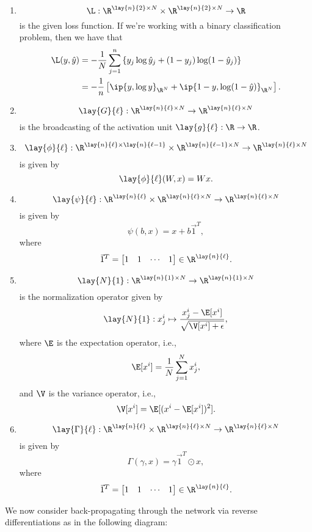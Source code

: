 \begin{enumerate}
	\item $$\L:\R^{\lay{n}{2}\times N}\times\R^{\lay{n}{2}\times N}\to\R$$
	is the given loss function.  If we're working with a binary classification problem, then we have that
	\begin{align*}
		\L(y,\hat{y})&=-\frac{1}{N}\sum_{j=1}^n\left\{y_j\log{\hat{y}_j}+(1-y_j)\log(1-\hat{y}_j)\right\}\\
		&=-\frac{1}{n}\left[\ip{y,\log{y}}_{\R^N}+\ip{1-y,\log(1-\hat{y})}_{\R^N}\right].
	\end{align*}
	
	\item $$\lay{G}{\ell}:\R^{\lay{n}{\ell}\times N}\to\R^{\lay{n}{\ell}\times N}$$
	is the broadcasting of the activation unit $\lay{g}{\ell}:\R\to\R$.
	
	\item $$\lay{\phi}{\ell}:\R^{\lay{n}{\ell}\times\lay{n}{\ell-1}}\times\R^{\lay{n}{\ell-1}\times N}\to\R^{\lay{n}{\ell}\times N}$$
	is given by
	$$\lay{\phi}{\ell}(W,x)=Wx.$$
	
	\item $$\lay{\psi}{\ell}:\R^{\lay{n}{\ell}}\times\R^{\lay{n}{\ell}\times N}\to\R^{\lay{n}{\ell}\times N}$$
	is given by
	$$\psi(b,x)=x+b\vec{1}^T,$$
	where
	$$\vec{1}^T=\begin{bmatrix}
		1&1&\cdots&1
	\end{bmatrix}\in\R^{\lay{n}{\ell}}.$$
	
	\item $$\lay{N}{1}:\R^{\lay{n}{1}\times N}\to\R^{\lay{n}{1}\times N}$$
	is the normalization operator given by
	$$\lay{N}{1}:x^i_j\mapsto \frac{x^i_j-\E[x^i]}{\sqrt{\V[x^i]+\epsilon}},$$
	where $\E$ is the expectation operator, i.e.,
	$$\E[x^i]=\frac{1}{N}\sum_{j=1}^Nx^i_j,$$
	and $\V$ is the variance operator, i.e.,
	$$\V[x^i]=\E[(x^i-\E[x^i])^2].$$
	
	\item $$\lay{\Gamma}{\ell}:\R^{\lay{n}{\ell}}\times\R^{\lay{n}{\ell}\times N}\to\R^{\lay{n}{\ell}\times N}$$
	is given by
	$$\Gamma(\gamma, x)=\gamma\vec{1}^T\odot x,$$
	where
	$$\vec{1}^T=\begin{bmatrix}
		1&1&\cdots&1
	\end{bmatrix}\in\R^{\lay{n}{\ell}}.$$
\end{enumerate}

We now consider back-propagating through the network via reverse differentiations as in the following diagram:


